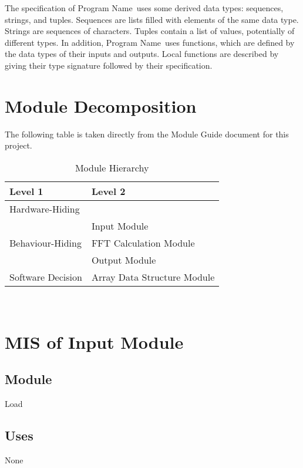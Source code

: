\documentclass[12pt, titlepage]{article}
\newcommand{\progname}{Program Name}
\begin{document}
\noindent
The specification of \progname \ uses some derived data types: sequences, strings, and
tuples. Sequences are lists filled with elements of the same data type. Strings
are sequences of characters. Tuples contain a list of values, potentially of
different types. In addition, \progname \ uses functions, which
are defined by the data types of their inputs and outputs. Local functions are
described by giving their type signature followed by their specification.

\section{Module Decomposition}

The following table is taken directly from the Module Guide document for this project.

\begin{table}[h!]
\centering
\begin{tabular}{p{} p{}}
\toprule
\textbf{Level 1} & \textbf{Level 2}\\
\midrule

{Hardware-Hiding} & ~ \\
\midrule

\multirow{3}{0.3\textwidth}{Behaviour-Hiding}
& Input Module\\
& FFT Calculation Module\\
& Output  Module\\
\midrule

\multirow{1}{0.3\textwidth}{Software Decision} & Array Data Structure Module\\
\bottomrule

\end{tabular}
\caption{Module Hierarchy}
\label{TblMH}
\end{table}

~\newpage

\section{MIS of Input  Module} \label{Input} 

\subsection{Module}

Load

\subsection{Uses}
None
\end{document}
